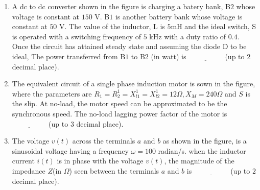 \documentclass[journal,12pt,onecolumn]{IEEEtran}
\theoremstyle{remark}
\begin{document}
\begin{enumerate}
\item A dc to dc converter shown in the figure is charging a batery bank, B$2$ whose voltage is constant at $150$ V. B$1$ is another battery bank whose voltage is constant at $50$ V. The value of the inductor, L is $5$mH and the ideal switch, S is operated with a switching frequency of $5$ kHz with a duty ratio of $0.4.$ Once the circuit has attained steady state and assuming the diode D to be ideal, The power transferred from B$1$ to B$2$
(in watt) is $\underline{\hspace{2cm}}$  (up to $2$ decimal place).\\


\item The equivalent circuit of a single phase induction motor is sown in the figure, where the parameters are $R_1=R_2^1=X_{l1}^1=X_{l2}^1=12\Omega, X_M=240\Omega$ and $S$ is the slip. At no-load, the motor speed can be approximated to be the synchronous speed. The no-load lagging power factor of the motor is $\underline{\hspace{2cm}}$  (up to $3$ decimal place).\\


\item The voltage $v(t)$ across the terminals $a$ and $b$ as shown in the figure, is a sinusoidal voltage having a frequency $\omega=100$ radian/s. when the inductor current $i(t)$ is in phase with the voltage $v(t)$, the magnitude of the impedance $Z$(in $\Omega$) seen between the terminals $a$ and $b$ is $\underline{\hspace{2cm}}$  (up to $2$ decimal place).\\

\end{enumerate}
\end{document}
